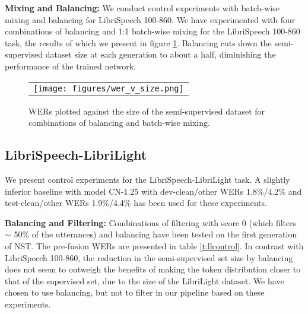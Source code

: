 \documentclass[a4paper]{article}
\begin{document}
\noindent\textbf{Mixing and Balancing:}  We conduct control experiments with batch-wise mixing and balancing for LibriSpeech 100-860. We have experimented with four combinations of balancing and 1:1 batch-wise mixing for the LibriSpeech 100-860 task, the results of which we present in figure \ref{f:bm}. Balancing cuts down the semi-supervised dataset size at each generation to about a half, diminishing the performance of the trained network.

\begin{figure}[h]
  \centering
  \begin{tabular}{c}
  \texttt{[image: figures/wer\_v\_size.png]}
  \end{tabular}
  \vskip -0.05in
  \caption{WERs plotted against the size of the semi-supervised dataset for combinations of balancing and batch-wise mixing.}
  \label{f:bm}
  \vskip -0.15in
\end{figure}

\subsection{LibriSpeech-LibriLight}

We present control experiments for the LibriSpeech-LibriLight task. A slightly inferior baseline with model CN-1.25 with dev-clean/other WERs 1.8\%/4.2\% and test-clean/other WERs 1.9\%/4.4\% has been used for these experiments.
\smallskip

\noindent\textbf{Balancing and Filtering:} Combinations of filtering with score 0 (which filters $\sim$ 50\% of the utterances) and balancing have been tested on the first generation of NST. The pre-fusion WERs are presented in table \ref{t:llcontrol}. In contrast with LibriSpeech 100-860, the reduction in the semi-supervised set size by balancing does not seem to outweigh the benefits of making the token distribution closer to that of the supervised set, due to the size of the LibriLight dataset. We have chosen to use balancing, but not to filter in our pipeline based on these experiments.

\begin{table}[h!]
  \vskip -0.05in
  \caption{WERs (\%) for balancing and filtering configurations.}
  \label{t:llcontrol}
  \vskip -0.05in
  \centering
  \small
  \vskip -0.05in
\end{table}
\end{document}
